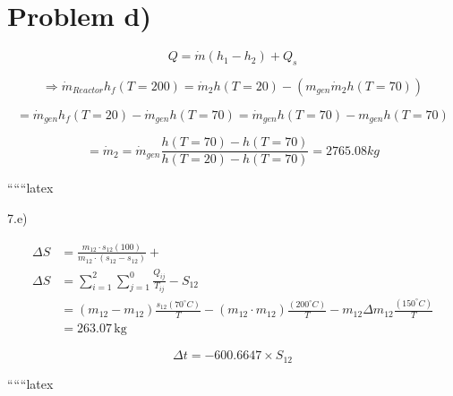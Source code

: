 \section*{Problem d)}

\begin{equation*}
Q = \dot{m} (h_{1} - h_{2}) + Q_{s}
\end{equation*}

\begin{equation*}
\Rightarrow \dot{m}_{Reactor} h_{f} (T = 200) = \dot{m}_{2} h (T = 20) - (m_{gen} \dot{m}_{2} h (T = 70))
\end{equation*}

\begin{equation*}
= \dot{m}_{gen} h_{f} (T = 20) - \dot{m}_{gen} h (T = 70) = \dot{m}_{gen} h (T = 70) - m_{gen} h (T = 70)
\end{equation*}

\begin{equation*}
= \dot{m}_{2} = \dot{m}_{gen} \frac{h (T = 70) - h (T = 70)}{h (T = 20) - h (T = 70)} = 2765.08 kg
\end{equation*}

``````latex


7.e)

\begin{align*}
\Delta S &= \frac{m_{12} \cdot s_{12}(100)}{m_{12} \cdot (s_{12}-s_{12})} + \\
\Delta S &= \sum_{i=1}^{2} \sum_{j=1}^{0} \frac{Q_{ij}}{T_{ij}} - S_{12} \\
&= (m_{12} - m_{12}) \frac{s_{12}(70^\circ C)}{T} - (m_{12} \cdot m_{12}) \frac{(200^\circ C)}{T} - m_{12} \Delta m_{12} \frac{(150^\circ C)}{T} \\
&= 263.07 \, \text{kg}
\end{align*}

\[
\Delta t = -600.6647 \times S_{12}
\]

``````latex